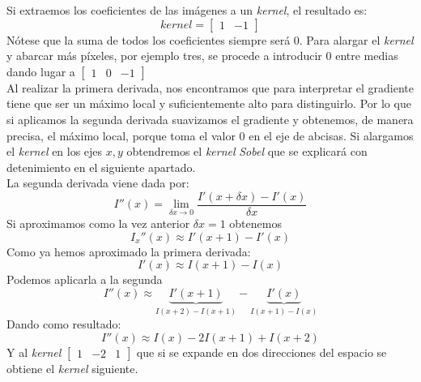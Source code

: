 Si extraemos los coeficientes de las imágenes a un \emph{kernel}, el
resultado es:
\begin{equation*}
  kernel = \begin{bmatrix}
    1 & -1
  \end{bmatrix}
\end{equation*}
Nótese que la suma de todos los coeficientes siempre será $0$. Para
alargar el \emph{kernel} y abarcar más píxeles, por ejemplo tres, se
procede a introducir $0$ entre medias dando lugar a
$\begin{bmatrix} 1 & 0 & -1 \end{bmatrix}$ \\
Al realizar la primera derivada, nos encontramos que para interpretar
el gradiente tiene que ser un máximo local y suficientemente alto para
distinguirlo. Por lo que si aplicamos la segunda derivada suavizamos
el gradiente y obtenemos, de manera precisa, el máximo local, porque
toma el valor $0$ en el eje de abcisas. Si alargamos el \emph{kernel}
en los ejes $x, y$ obtendremos el \emph{kernel}
\emph{Sobel} que se explicará con detenimiento en el siguiente apartado. \\
La segunda derivada viene dada por:
\begin{equation*}
  I''(x) = \lim_{\delta x \to 0}\frac{I'(x+\delta x) - I'(x)}{\delta x}
\end{equation*}
Si aproximamos como la vez anterior $\delta x = 1$ obtenemos
\begin{equation*}
  I_x''(x) \approx I'(x + 1) - I'(x)
\end{equation*}
Como ya hemos aproximado la primera derivada:
\begin{equation*}
  I'(x) \approx I(x + 1) - I(x)
\end{equation*}
Podemos aplicarla a la segunda
\begin{equation*}
  I''(x) \approx \underbrace{I'(x + 1)}_{I(x + 2) - I(x + 1)} - \underbrace{I'(x)}_{I(x + 1) - I(x)}
\end{equation*}
Dando como resultado:
\begin{equation*}
  I''(x) \approx I(x) - 2I(x + 1) + I(x + 2)
\end{equation*}
Y al \emph{kernel} $\begin{bmatrix} 1 & -2 & 1 \end{bmatrix}$ que si
se expande en dos direcciones del espacio se obtiene el \emph{kernel}
siguiente.
